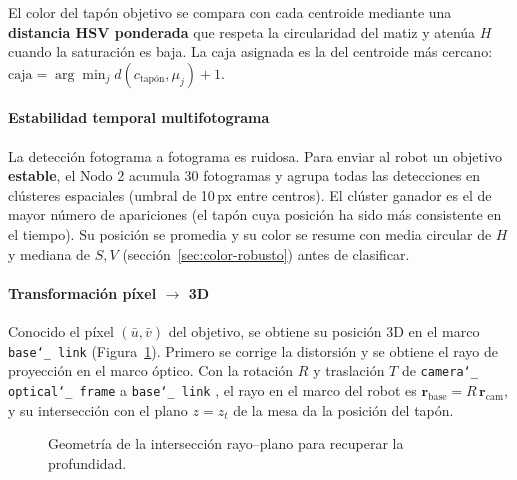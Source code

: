 \documentclass[12pt,a4paper]{article}
\newcommand{\code}[1]{%
  \begingroup
  \def\_{\char`_\penalty0 }%
  \def\/{\char`/\penalty0 }%
  \texttt{\small #1}%
  \endgroup}
\begin{document}
El color del tapón objetivo se compara con cada centroide mediante una
\textbf{distancia HSV ponderada} que respeta la
circularidad del matiz y atenúa $H$ cuando la saturación es baja.
La caja asignada es la del centroide más cercano:
$\text{caja}=\arg\min_{j} d(c_{\text{tapón}},\mu_j)+1$.

\clearpage
\paragraph{Estabilidad temporal multifotograma}

La detección fotograma a fotograma es ruidosa. Para enviar al robot un objetivo
\textbf{estable}, el Nodo 2 acumula 30 fotogramas y agrupa todas las detecciones
en clústeres espaciales (umbral de 10\,px entre centros). El clúster
ganador es el de mayor número de apariciones (el tapón cuya posición ha
sido más consistente en el tiempo). Su posición se promedia y su color se resume
con media circular de $H$ y mediana de $S,V$ (sección~\ref{sec:color-robusto}) antes de
clasificar.

\paragraph{Transformación píxel \texorpdfstring{$\rightarrow$}{->} 3D}
\label{sec:pixel3d}

Conocido el píxel $(\bar u,\bar v)$ del objetivo, se obtiene su posición 3D en el
marco \code{base\_link} (Figura~\ref{fig:rayo}). Primero se corrige la distorsión y
se obtiene el rayo de proyección en el marco óptico. Con la rotación $R$ y
traslación $T$ de \code{camera\_optical\_frame} a \code{base\_link}, el rayo en el
marco del robot es $\mathbf{r}_{\text{base}}=R\,\mathbf{r}_{\text{cam}}$, y su
intersección con el plano $z=z_t$ de la mesa da la posición del tapón.

\begin{figure}[H]
\centering
{}
\caption{Geometría de la intersección rayo--plano para recuperar la profundidad.}
\label{fig:rayo}
\end{figure}
\end{document}
